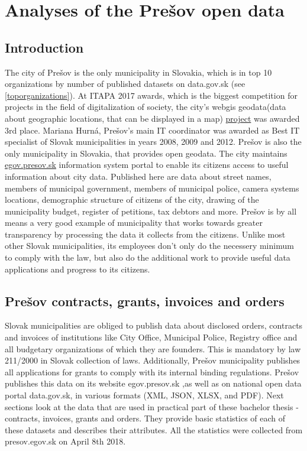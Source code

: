 \documentclass[thesis=B,english]{FITthesis}[2012/06/26]
\begin{document}
\chapter{Analyses of the Prešov open data}
	\section{Introduction}
	The city of Prešov is the only municipality in Slovakia, which is in top 10 organizations by number of published datasets on data.gov.sk (see \ref{toporganizations}). At ITAPA 2017 awards, which is the biggest competition for projects in the field of digitalization of society, the city's webgis geodata(data about geographic locations, that can be displayed in a map) \href{http://webgis.presov.sk/}{project} was awarded 3rd place. Mariana Hurná, Prešov's main IT coordinator was awarded as Best IT specialist of Slovak municipalities in years 2008, 2009 and 2012. Prešov is also the only municipality in Slovakia, that provides open geodata. The city maintains \href{http://egov.presov.sk}{egov.presov.sk} information system  portal to enable its citizens access to useful information about city data. Published here are data about street names, members of municipal government, members of municipal police, camera systems locations, demographic structure of citizens of the city, drawing of the municipality budget, register of petitions, tax debtors and more. Prešov is by all means a very good example of municipality that works towards greater  transparency by processing the data it collects from the citizens. Unlike most other Slovak municipalities, its employees don't only do the necessery minimum to comply with the law, but also do the additional work to provide useful data applications and progress to its citizens.
	
	\section{Prešov contracts, grants, invoices and orders}
	Slovak municipalities are obliged to publish data about disclosed orders, contracts and invoices of institutions like City Office, Municipal Police, Registry office and all budgetary organizations of which they are founders. This is mandatory by law 211/2000 in Slovak collection of laws. Additionally, Prešov municipality  publishes all applications for grants to comply with its internal binding regulations. Prešov publishes this data on its website egov.presov.sk ,as well as on national open data portal data.gov.sk, in various formats (XML, JSON, XLSX, and PDF). Next sections look at the data that are used in practical part of these bachelor thesis - contracts, invoices, grants and orders. They provide basic statistics of each of these datasets and describes their attributes. All the statistics were collected from presov.egov.sk on April 8th 2018.
\end{document}
